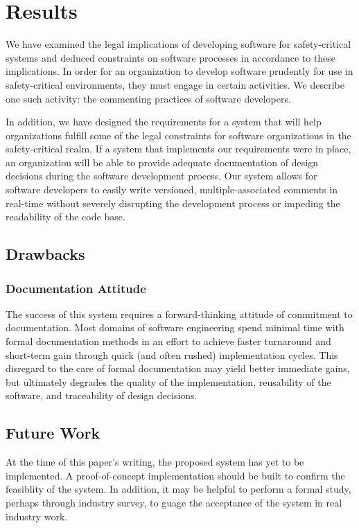 \section{Results}\label{results}
We have examined the legal implications of developing software for
safety-critical systems and deduced constraints on software processes in
accordance to these implications. In order for an organization to develop 
software prudently for use in safety-critical environments, they must engage in
certain activities. We describe one such activity: the commenting practices of
software developers.

In addition, we have designed the requirements for a system that will help
organizations fulfill some of the legal constraints for software organizations
in the safety-critical realm. If a system that implements our requirements were
in place, an organization will be able to provide adequate documentation of
design decisions during the software development process. Our system allows for
software developers to easily write versioned, multiple-associated comments in
real-time without severely disrupting the  development process or impeding the
readability of the code base.

\subsection{Drawbacks}

\subsubsection*{Documentation Attitude}
The success of this system requires a forward-thinking attitude of commitment to
documentation. Most domains of software engineering spend minimal time with
formal documentation methods in an effort to achieve faster turnaround and
short-term gain through quick (and often rushed) implementation cycles. This
disregard to the care of formal documentation may yield better immediate gains,
but ultimately degrades the quality of the implementation, reusability of the
software,  and traceability of design decisions.

\subsection{Future Work}
At the time of this paper's writing, the proposed system has yet to be
implemented. A proof-of-concept implementation should be built to confirm the
feasiblity of the system. In addition, it may be helpful to perform a formal
study, perhaps through industry survey, to guage the acceptance of the system in
real industry work.

